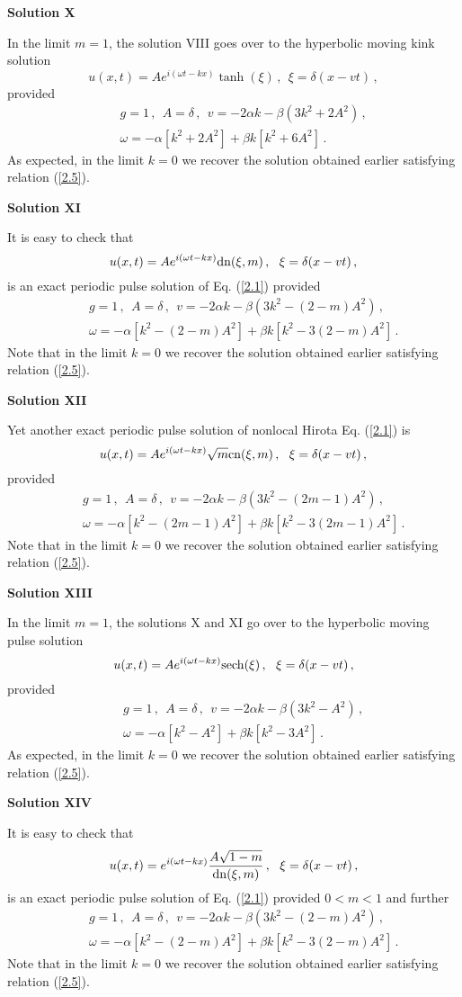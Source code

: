 \documentclass[11pt]{article}
\newcommand{\be}{\begin{equation}}
\newcommand{\ee}{\end{equation}}
\newcommand{\bea}{\begin{eqnarray}}
\newcommand{\eea}{\end{eqnarray}}
\newcommand{\dn}{{\rm dn}}
\newcommand{\cn}{{\rm cn}}
\newcommand{\sech}{{\rm sech}}
\begin{document}
{\bf Solution X}

In the limit $m = 1$, the solution VIII goes over to the hyperbolic 
moving kink solution
\be\label{8.4}
u(x,t) = A e^{i(\omega t - kx)} \tanh(\xi)\,,~~\xi = \delta(x-vt)\,,
\ee
provided
\bea\label{8.5}
&&g = 1\,,~~A = \delta\,,~~v = -2\alpha k -\beta(3k^2+2 A^2)\,,
\nonumber \\
&&\omega = -\alpha[k^2+2A^2] +\beta k [k^2+6 A^2]\,.
\eea
As expected, in the limit $k = 0$ we recover the solution obtained 
earlier \cite{ks2} satisfying relation (\ref{2.5}). 

{\bf Solution XI}

It is easy to check that 
\be\label{8.6}
u(x,t) = A e^{i(\omega t - kx)} \dn(\xi,m)\,,~~\xi = \delta(x-vt)\,,
\ee
is an exact periodic pulse solution of Eq. (\ref{2.1}) provided
\bea\label{8.7}
&&g = 1\,,~~A = \delta\,,~~v = -2\alpha k -\beta(3k^2-(2-m)A^2)\,,
\nonumber \\
&&\omega = -\alpha[k^2-(2-m)A^2] + \beta k [k^2-3(2-m)A^2]\,. 
\eea
Note that in the limit $k = 0$ we recover the solution obtained 
earlier \cite{ks2} satisfying relation (\ref{2.5}). 

{\bf Solution XII}

Yet another exact periodic pulse solution of nonlocal Hirota Eq.
(\ref{2.1}) is 
\be\label{8.8}
u(x,t) = A e^{i(\omega t - kx)} \sqrt{m} \cn(\xi,m)\,,~~\xi = \delta(x-vt)\,,
\ee
provided
\bea\label{8.9}
&&g = 1\,,~~A = \delta\,,~~v = -2\alpha k -\beta(3k^2-(2m-1)A^2)\,,
\nonumber \\
&&\omega = -\alpha[k^2-(2m-1)A^2]+ \beta k [k^2-3(2m-1)A^2]\,. 
\eea
Note that in the limit $k = 0$ we recover the solution obtained 
earlier \cite{ks2} satisfying relation (\ref{2.5}). 

{\bf Solution XIII}

In the limit $m = 1$, the solutions X and XI go over to the hyperbolic 
moving pulse solution
\be\label{8.10}
u(x,t) = A e^{i(\omega t - kx)} \sech(\xi)\,,~~\xi = \delta(x-vt)\,,
\ee
provided
\bea\label{8.11}
&&g = 1\,,~~A = \delta\,,~~v = -2\alpha k -\beta(3k^2- A^2)\,,
\nonumber \\
&&\omega = -\alpha[k^2-A^2] +\beta k [k^2-3 A^2]\,.
\eea
As expected, in the limit $k = 0$ we recover the solution obtained 
earlier \cite{ks2} satisfying relation (\ref{2.5}). 

{\bf Solution XIV}

It is easy to check that 
\be\label{8.12}
u(x,t) = e^{i(\omega t - kx)} \frac{A\sqrt{1-m}}{\dn(\xi,m)}\,,
~~\xi = \delta(x-vt)\,,
\ee
is an exact periodic pulse solution of Eq. (\ref{2.1}) provided
$0 < m < 1$ and further
\bea\label{8.13}
&&g = 1\,,~~A = \delta\,,~~v = -2\alpha k -\beta(3k^2-(2-m)A^2)\,,
\nonumber \\
&&\omega = -\alpha[k^2-(2-m)A^2]+ \beta k [k^2-3(2-m)A^2]\,. 
\eea
Note that in the limit $k = 0$ we recover the solution obtained 
earlier \cite{ks2} satisfying relation (\ref{2.5}). 
\end{document}

